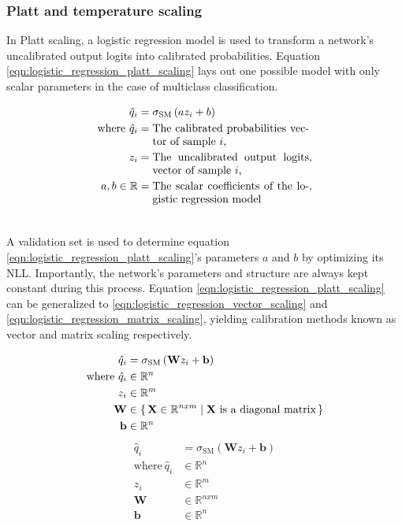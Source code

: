 \subsubsection{Platt and temperature scaling}
\label{subsubsection_platt_temperature_scaling}
In Platt scaling, a logistic regression model is used to transform a network's uncalibrated output logits into calibrated probabilities. Equation \ref{eqn:logistic_regression_platt_scaling} lays out one possible model with only scalar parameters in the case of multiclass classification.

\begin{align}
\label{eqn:logistic_regression_platt_scaling}
\hat{q}_{i} &= \sigma_{\mathrm{SM}}\left(a z_{i} + b\right) \\ \nonumber
\text{where}~\hat{q}_{i} &= \parbox[t]{5cm}{The calibrated probabilities vector of sample $i$,} \\ \nonumber
z_{i} &= \parbox[t]{5cm}{The uncalibrated output logits vector of sample $i$,}, \\ \nonumber
a, b \in \mathbb{R} &= \parbox[t]{5cm}{The scalar coefficients of the logistic regression model}, \\ \nonumber
\end{align}

A validation set is used to determine equation \ref{eqn:logistic_regression_platt_scaling}'s parameters $a$ and $b$ by optimizing its NLL. Importantly, the network's parameters and structure are always kept constant during this process. Equation \ref{eqn:logistic_regression_platt_scaling} can be generalized to \ref{eqn:logistic_regression_vector_scaling} and \ref{eqn:logistic_regression_matrix_scaling}, yielding calibration methods known as vector and matrix scaling respectively.

\begin{align}
\label{eqn:logistic_regression_vector_scaling}
\hat{q}_{i} &= \sigma_{\mathrm{SM}}\left(\mathbf{W} z_{i} + \mathbf{b}\right) \\ \nonumber
\text{where}~\hat{q}_{i} &\in \mathbb{R}^{n} \\ \nonumber
z_{i} &\in \mathbb{R}^{m} \\ \nonumber
\mathbf{W} &\in \{\, \mathbf{X} \in \mathbb{R}^{nxm} \mid \text{$\mathbf{X}$ is a diagonal matrix} \,\} \\ \nonumber
\mathbf{b} &\in \mathbb{R}^{n}
\end{align}
\begin{align}
\label{eqn:logistic_regression_matrix_scaling}
\hat{q}_{i} &= \sigma_{\mathrm{SM}}\left(\mathbf{W} z_{i} + \mathbf{b}\right) \\ \nonumber
\text{where}~\hat{q}_{i} &\in \mathbb{R}^{n} \\ \nonumber
z_{i} &\in \mathbb{R}^{m} \\ \nonumber
\mathbf{W} &\in \mathbb{R}^{nxm} \\ \nonumber
\mathbf{b} &\in \mathbb{R}^{n}
\end{align}

